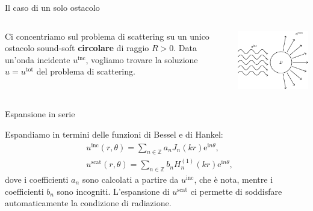 \documentclass{beamer}
\newcommand{\IZ}{{\mathbb Z}}
\newcommand{\inc}{{\mathrm{inc}}}
\newcommand{\tot}{{\mathrm{tot}}}
\newcommand{\scat}{{\mathrm{scat}}}
\newcommand{\ri}{{\mathrm i}}
\newcommand{\re}{{\mathrm e}}
\begin{document}
	\begin{frame}{Il caso di un solo ostacolo}
		
		\begin{columns}
			\begin{column}{0.4\textwidth}
				\begin{block}{}
					Ci concentriamo sul problema di scattering su un unico ostacolo sound-soft \textbf{circolare} di raggio $R>0$. Data un'onda incidente $u^\inc$, vogliamo trovare la soluzione $u=u^\tot$ del problema di scattering.
				\end{block}
			\end{column}
			\begin{column}{0.5\textwidth}
				\begin{center}
					\includegraphics[width=\textwidth]{figs/scat.pdf}      
				\end{center}
			\end{column}
		\end{columns}
	\end{frame}
	
	\begin{frame}{Espansione in serie}
		\begin{block}{}
			Espandiamo in termini delle funzioni di Bessel e di Hankel:
			\begin{align*}
				& u^\inc(r,\theta)=\sum_{n \in \IZ} a_n J_n(kr)\re^{\ri n\theta}, \\
				& u^\scat(r,\theta)=\sum_{n \in \IZ} b_n H_n^{(1)}(kr)\re^{\ri n\theta},
			\end{align*}
			dove i coefficienti $a_n$ sono calcolati a partire da $u^\inc$, che è nota, mentre i coefficienti $b_n$ sono incogniti. L'espansione di $u^\scat$ ci permette di soddisfare automaticamente la condizione di radiazione.
		\end{block}
	\end{frame}
	
\end{document}
